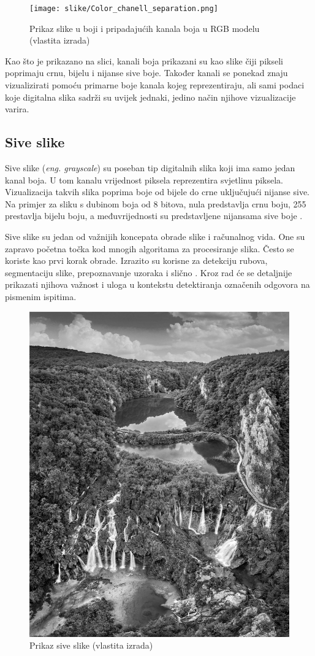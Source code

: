 \documentclass{foi}
\begin{document}
\begin{figure}[H]
    \centering
    \texttt{[image: slike/Color\_chanell\_separation.png]}
    \caption{Prikaz slike u boji i pripadajućih kanala boja u RGB modelu (vlastita izrada)}
    \label{fig:channels}
\end{figure}

Kao što je prikazano na slici, kanali boja prikazani su kao slike čiji pikseli poprimaju crnu, bijelu i nijanse sive boje. Također kanali se ponekad znaju vizualizirati pomoću primarne boje kanala kojeg reprezentiraju, ali sami podaci koje digitalna slika sadrži su uvijek jednaki, jedino način njihove vizualizacije varira. 

\subsection{Sive slike}

Sive slike (\textit{eng. grayscale}) su poseban tip digitalnih slika koji ima samo jedan kanal boja. U tom kanalu vrijednost piksela reprezentira svjetlinu piksela. Vizualizacija takvih slika poprima boje od bijele do crne uključujući nijanse sive. Na primjer za sliku s dubinom boja od 8 bitova, nula predstavlja crnu boju, 255 prestavlja bijelu boju, a međuvrijednosti su predstavljene nijansama sive boje \cite{GrayscaleSlika}.

Sive slike su jedan od važnijih koncepata obrade slike i računalnog vida. One su zapravo početna točka kod mnogih algoritama za procesiranje slika. Često se koriste kao prvi korak obrade. Izrazito su korisne za detekciju rubova, segmentaciju slike, prepoznavanje uzoraka i slično \cite{Grayscale2}. Kroz rad će se detaljnije prikazati njihova važnost i uloga u kontekstu detektiranja označenih odgovora na pismenim ispitima. 

\begin{figure}[H]
    \centering
    \includegraphics[width=0.7\linewidth]{slike/Grayscale.jpeg}
    \caption{Prikaz sive slike (vlastita izrada)}
\end{figure}
\end{document}
